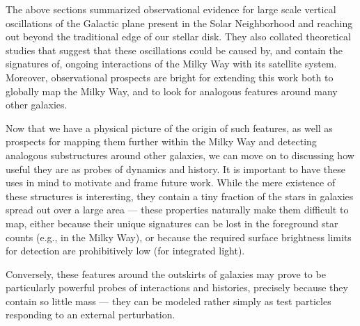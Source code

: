 \documentclass[galaxies,article,submit,moreauthors,pdftex,10pt,a4paper]{mdpi}
\begin{document}
\label{sec:conc}

The above sections  summarized observational evidence for large scale vertical oscillations of the Galactic plane present in the Solar Neighborhood and reaching out beyond the traditional edge of our stellar disk.
They also collated theoretical studies that suggest that these oscillations could be caused by, and contain the signatures of, ongoing interactions of the Milky Way with its satellite system.
Moreover, observational prospects are bright for extending this work both to globally map the Milky Way, and to look for analogous features around many other galaxies.

Now that we have a physical picture of the origin of such features, as well as prospects for mapping them further within the Milky Way and detecting analogous substructures around other galaxies, we can move on to discussing how useful they are as probes of dynamics and history.
It is important to have these uses in mind to motivate and frame  future work.
While the mere existence of these structures is interesting, they contain a tiny fraction of the stars in galaxies spread out over a large area --- these properties naturally make them difficult to map, either because their unique signatures can be lost in the foreground star counts (e.g., in the Milky Way), or  because the required surface brightness limits for detection are prohibitively low (for integrated light).

Conversely, these features around the outskirts of galaxies may prove to be particularly powerful probes of interactions and histories, precisely because they contain so little mass --- they can be modeled rather simply as test particles responding to an external perturbation.
\end{document}
